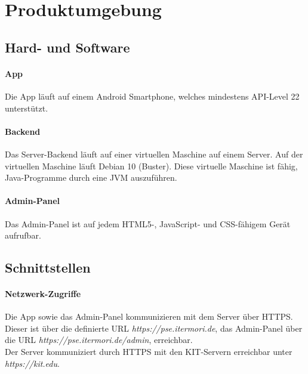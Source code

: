 \newpage
\section{Produktumgebung}

\subsection{Hard- und Software}
    \paragraph{App}
        Die App läuft auf einem Android Smartphone, welches mindestens API-Level 22 unterstützt.

    \paragraph{Backend}
        Das Server-Backend läuft auf einer virtuellen Maschine auf einem Server.
        Auf der virtuellen Maschine läuft Debian 10 (Buster).
        Diese virtuelle Maschine ist fähig, Java-Programme durch eine JVM auszuführen.

    \paragraph{Admin-Panel}
        Das Admin-Panel ist auf jedem HTML5-, JavaScript- und CSS-fähigem Gerät aufrufbar.

\subsection{Schnittstellen}
    \paragraph{Netzwerk-Zugriffe}
        Die App sowie das Admin-Panel kommunizieren mit dem Server über HTTPS. Dieser ist über die definierte URL \textit{https://pse.itermori.de},
        das Admin-Panel über die URL \textit{https://pse.itermori.de/admin}, erreichbar. \\
        Der Server kommuniziert durch HTTPS mit den KIT-Servern erreichbar unter \textit{https://kit.edu}.
